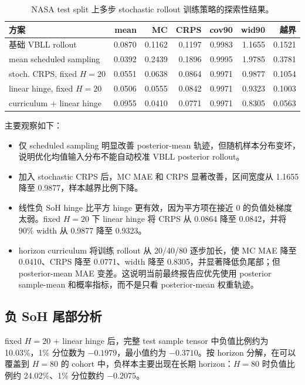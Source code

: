 \documentclass[11pt,a4paper,fontset=none]{ctexart}
\begin{document}
\begin{table}[h]
\centering
\scriptsize
\setlength{\tabcolsep}{3pt}
\begin{tabular}{lrrrrrr}
\toprule
方案 & mean & MC & CRPS & cov90 & wid90 & 越界 \\
\midrule
基础 VBLL rollout & 0.0870 & 0.1162 & 0.1197 & 0.9983 & 1.1655 & 0.1521 \\
mean scheduled sampling & 0.0392 & 0.2439 & 0.1896 & 0.9995 & 1.9785 & 0.3781 \\
stoch. CRPS, fixed $H=20$ & 0.0551 & 0.0638 & 0.0864 & 0.9971 & 0.9877 & 0.1054 \\
linear hinge, fixed $H=20$ & 0.0506 & 0.0555 & 0.0842 & 0.9971 & 0.9323 & 0.1003 \\
curriculum + linear hinge & 0.0955 & 0.0410 & 0.0771 & 0.9971 & 0.8305 & 0.0563 \\
\bottomrule
\end{tabular}
\caption{NASA test split 上多步 stochastic rollout 训练策略的探索性结果。}
\label{tab:nasa_rollout_ablation}
\end{table}

主要观察如下：
\begin{itemize}
  \item 仅 scheduled sampling 明显改善 posterior-mean 轨迹，但随机样本分布变坏，说明优化均值输入分布不能自动校准 VBLL posterior rollout。
  \item 加入 stochastic CRPS 后，MC MAE 和 CRPS 显著改善，区间宽度从 1.1655 降至 0.9877，样本越界比例下降。
  \item 线性负 SoH hinge 比平方 hinge 更有效，因为平方项在接近 0 的负值处梯度太弱。fixed $H=20$ 下 linear hinge 将 CRPS 从 0.0864 降至 0.0842，并将 90\% width 从 0.9877 降至 0.9323。
  \item horizon curriculum 将训练 rollout 从 20/40/80 逐步加长，使 MC MAE 降至 0.0410、CRPS 降至 0.0771、width 降至 0.8305，并显著降低负尾部；但 posterior-mean MAE 变差。这说明当前最终报告应优先使用 posterior sample-mean 和概率指标，而不是只看 posterior-mean 权重轨迹。
\end{itemize}

\subsection{负 SoH 尾部分析}

fixed $H=20$ + linear hinge 后，完整 test sample tensor 中负值比例约为 10.03\%，1\% 分位数为 $-0.1979$，最小值约为 $-0.3710$。按 horizon 分解，在可以覆盖到 $H=80$ 的 cohort 中，负样本主要出现在长期 horizon：$H=80$ 时负值比例约 24.02\%、1\% 分位数约 $-0.2075$。
\end{document}
